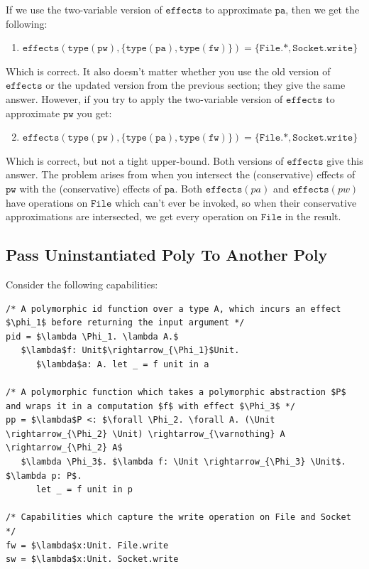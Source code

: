 \documentclass{llncs}
\newcommand{\keywadj}[1]{\mathtt{#1}}
\newcommand{\kwa}[1]{\keywadj{ #1 }}
\newcommand{\Unit}[0]{ \kwa{Unit} }
\newcommand{\fx}[1]{ \kwa{effects}(#1) }
\begin{document}
\noindent
If we use the two-variable version of $\kwa{effects}$ to approximate $\kwa{pa}$, then we get the following:

\begin{enumerate}
	\item $\kwa{effects(type(pw), \{type(pa), type(fw)\}) = \{ File.*, Socket.write \}}$
\end{enumerate}

\noindent
Which is correct. It also doesn't matter whether you use the old version of $\kwa{effects}$ or the updated version from the previous section; they give the same answer. However, if you try to apply the two-variable version of $\kwa{effects}$ to approximate $\kwa{pw}$ you get:

\begin{enumerate}
	\setcounter{enumi}{1}
	\item $\kwa{effects(type(pw), \{type(pa), type(fw)\}) = \{File.*, Socket.write\}}$
\end{enumerate}

Which is correct, but not a tight upper-bound. Both versions of $\kwa{effects}$ give this answer. The problem arises from when you intersect the (conservative) effects of $\kwa{pw}$ with the (conservative) effects of $\kwa{pa}$. Both $\fx{pa}$ and $\fx{pw}$ have operations on $\kwa{File}$ which can't ever be invoked, so when their conservative approximations are intersected, we get every operation on $\kwa{File}$ in the result.

\subsection{Pass Uninstantiated Poly To Another Poly}

Consider the following capabilities:

\begin{lstlisting}
/* A polymorphic id function over a type A, which incurs an effect $\phi_1$ before returning the input argument */
pid = $\lambda \Phi_1. \lambda A.$
   $\lambda$f: Unit$\rightarrow_{\Phi_1}$Unit.
      $\lambda$a: A. let _ = f unit in a

/* A polymorphic function which takes a polymorphic abstraction $P$ and wraps it in a computation $f$ with effect $\Phi_3$ */
pp = $\lambda$P <: $\forall \Phi_2. \forall A. (\Unit \rightarrow_{\Phi_2} \Unit) \rightarrow_{\varnothing} A \rightarrow_{\Phi_2} A$
   $\lambda \Phi_3$. $\lambda f: \Unit \rightarrow_{\Phi_3} \Unit$. $\lambda p: P$.
      let _ = f unit in p

/* Capabilities which capture the write operation on File and Socket */
fw = $\lambda$x:Unit. File.write
sw = $\lambda$x:Unit. Socket.write
\end{lstlisting}
\end{document}
